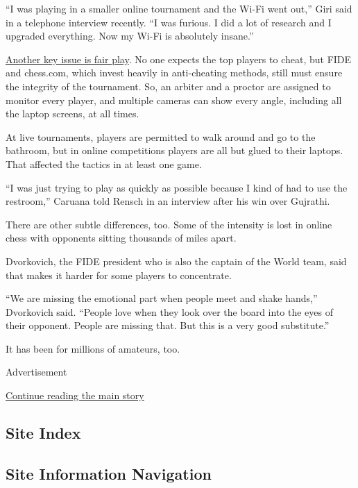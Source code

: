 ``I was playing in a smaller online tournament and the Wi-Fi went out,''
Giri said in a telephone interview recently. ``I was furious. I did a
lot of research and I upgraded everything. Now my Wi-Fi is absolutely
insane.''

\href{https://www.nytimes3xbfgragh.onion/2020/03/15/sports/chess-cheating.html}{Another
key issue is fair play}. No one expects the top players to cheat, but
FIDE and chess.com, which invest heavily in anti-cheating methods, still
must ensure the integrity of the tournament. So, an arbiter and a
proctor are assigned to monitor every player, and multiple cameras can
show every angle, including all the laptop screens, at all times.

At live tournaments, players are permitted to walk around and go to the
bathroom, but in online competitions players are all but glued to their
laptops. That affected the tactics in at least one game.

``I was just trying to play as quickly as possible because I kind of had
to use the restroom,'' Caruana told Rensch in an interview after his win
over Gujrathi.

There are other subtle differences, too. Some of the intensity is lost
in online chess with opponents sitting thousands of miles apart.

Dvorkovich, the FIDE president who is also the captain of the World
team, said that makes it harder for some players to concentrate.

``We are missing the emotional part when people meet and shake hands,''
Dvorkovich said. ``People love when they look over the board into the
eyes of their opponent. People are missing that. But this is a very good
substitute.''

It has been for millions of amateurs, too.

Advertisement

\protect\hyperlink{after-bottom}{Continue reading the main story}

\hypertarget{site-index}{%
\subsection{Site Index}\label{site-index}}

\hypertarget{site-information-navigation}{%
\subsection{Site Information
Navigation}\label{site-information-navigation}}

